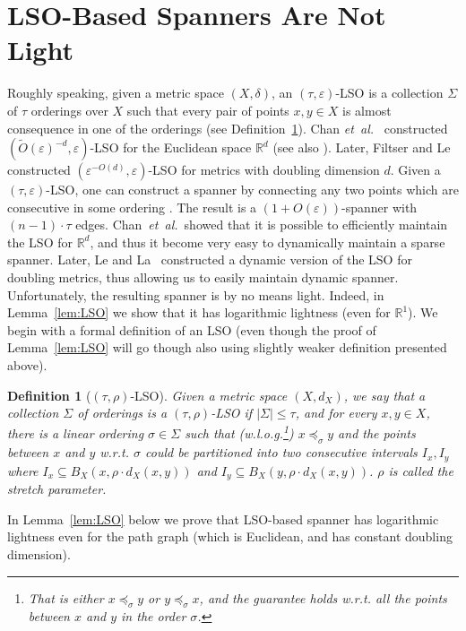 \documentclass[11pt]{article}
\def\etal{\emph{et~al.}}			%
\def\Real{\mathbb{R}}
\let\R\Real
\newtheorem{definition}[theorem]{Definition}
\def\eps{\varepsilon}
\begin{document}
\section{LSO-Based Spanners Are Not Light}\label{sec:LSO}
Roughly speaking, given a metric space $(X,\delta)$, an $(\tau,\varepsilon)$-LSO is a collection $\Sigma$ of $\tau$ orderings over $X$ such that every pair of points $x,y\in X$ is almost consequence in one of the orderings (see Definition~\ref{def:LSO}).
Chan \etal~\cite{chan2020locality} constructed $(\tilde{O}(\eps)^{-d},\eps)$-LSO for the Euclidean space $\R^d$ (see also \cite{GaoH24}).
Later, Filtser and Le \cite{filtser2022locality} constructed  $(\eps^{-O(d)},\eps)$-LSO for metrics with doubling dimension $d$.
Given a $(\tau,\eps)$-LSO, one can construct a spanner by connecting any two points which are consecutive in some ordering \cite{chan2020locality}. The result is a $(1+O(\eps))$-spanner with $(n-1)\cdot \tau$ edges. 
Chan~\etal~showed that it is possible to efficiently maintain the LSO for $\R^d$, and thus it become very easy to dynamically maintain a sparse spanner.
Later,  Le and La~\cite{la2025dynamic} constructed a dynamic version of the LSO for doubling metrics, thus allowing us to easily maintain dynamic spanner.
Unfortunately, the resulting spanner is by no means light. Indeed, in Lemma~\ref{lem:LSO}  we show that it has logarithmic lightness (even for $\R^1$).
%
We begin with a formal definition of an LSO (even though the proof of Lemma~\ref{lem:LSO} will go though also using slightly weaker definition presented above).
\begin{definition}[$(\tau,\rho)$-LSO]\label{def:LSO}
    Given a metric space $(X,d_{X})$, we say that a collection $\Sigma$
	of orderings is a $(\tau,\rho)$-LSO if
	$\left|\Sigma\right|\le\tau$, and for every $x,y\in X$, there is
	a linear ordering $\sigma\in\Sigma$ such that (w.l.o.g.\footnote{That is either  $x\preceq_{\sigma}y$ or  $y\preceq_{\sigma}x$, and the guarantee holds w.r.t. all the points between $x$ and $y$ in the order $\sigma$.\label{foot:wlogOrder}}) $x\preceq_{\sigma}y$ and the points between $x$ and $y$ w.r.t. $\sigma$ could be partitioned
	into two consecutive intervals $I_{x},I_{y}$ where $I_{x}\subseteq B_{X}(x,\rho\cdot d_{X}(x,y))$	and $I_{y}\subseteq B_{X}(y,\rho\cdot d_{X}(x,y))$. $\rho$ is called the \emph{stretch} parameter. 
\end{definition}
In Lemma~\ref{lem:LSO} below we prove that LSO-based spanner has logarithmic lightness even for the path graph (which is Euclidean, and has constant doubling dimension).
\end{document}
